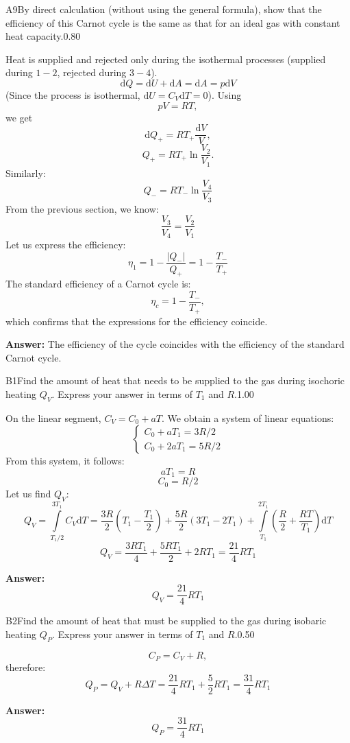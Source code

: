 \documentclass[11pt,a4paper]{article}
\begin{document}
\begin{solcard}{A9}{By direct calculation (without using the general formula), show that the efficiency of this Carnot cycle is the same as that for an ideal gas with constant heat capacity.}{0.80}

Heat is supplied and rejected only during the isothermal processes (supplied during $1-2$, rejected during $3-4$). \[\mathrm dQ=\mathrm dU+\mathrm dA=\mathrm dA=p\mathrm dV\](Since the process is isothermal, $\mathrm dU=C_V\mathrm dT=0$). Using \[pV=RT,\]we get \[\mathrm dQ_+=RT_+\dfrac{\mathrm dV}{V},\]\[Q_+=RT_+\ln\dfrac{V_2}{V_1}.\]Similarly: \[Q_-=RT_-\ln\dfrac{V_4}{V_3}\]From the previous section, we know: \[\dfrac{V_3}{V_4}=\dfrac{V_2}{V_1}\]Let us express the efficiency: \[\eta_1=1-\dfrac{|Q_-|}{Q_+}=1-\dfrac{T_-}{T_+}\]The standard efficiency of a Carnot cycle is: \[\eta_c=1-\dfrac{T_-}{T_+},\]which confirms that the expressions for the efficiency coincide.

\par\smallskip\noindent\textbf{Answer:} The efficiency of the cycle coincides with the efficiency of the standard Carnot cycle.
\end{solcard}

\begin{solcard}{B1}{Find the amount of heat that needs to be supplied to the gas during isochoric heating $Q_V$. Express your answer in terms of $T_1$ and $R$.}{1.00}

On the linear segment, $C_V=C_0+aT$. We obtain a system of linear equations: \[\begin{cases}C_0+aT_1=3R/2\\ C_0+2aT_1=5R/2\end{cases}\] From this system, it follows: \[aT_1=R\]\[C_0=R/2\] Let us find $Q_V$: \[Q_V=\int\limits_{T_1/2}^{3T_1}{C_V\mathrm dT}=\dfrac{3R}{2}\left(T_1-\dfrac{T_1}{2}\right)+\dfrac{5R}{2}\left(3T_1-2T_1\right)+\int\limits_{T_1}^{2T_1}{\left(\frac{R}{2}+\frac{RT}{T_1}\right)\mathrm dT}\]\[Q_V=\frac{3RT_1}{4}+\frac{5RT_1}{2}+2RT_1=\dfrac{21}{4}RT_1\]

\par\smallskip\noindent\textbf{Answer:} \[Q_V=\dfrac{21}{4}RT_1\]
\end{solcard}

\begin{solcard}{B2}{Find the amount of heat that must be supplied to the gas during isobaric heating $Q_P$. Express your answer in terms of $T_1$ and $R$.}{0.50}

\[C_P=C_V+R,\]therefore: \[Q_P=Q_V+R\Delta T=\frac{21}{4}RT_1+\frac{5}{2}RT_1=\frac{31}{4}RT_1\]

\par\smallskip\noindent\textbf{Answer:} \[Q_P=\dfrac{31}{4}RT_1\]
\end{solcard}
\end{document}
